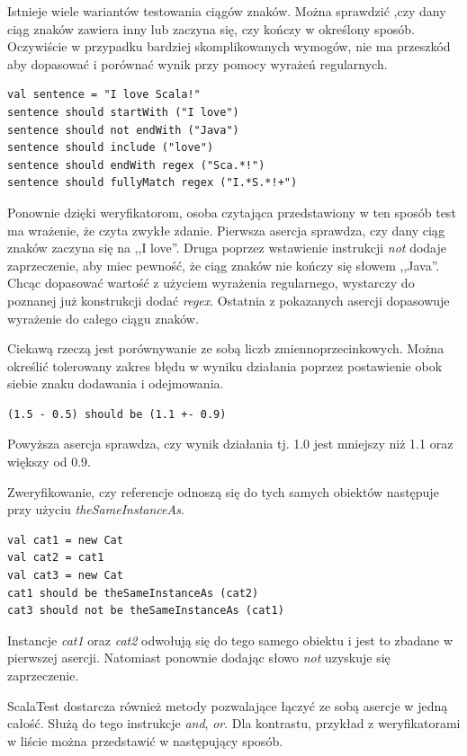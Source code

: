 \documentclass[brudnopis]{xmgr}
\begin{document}
Istnieje wiele wariantów testowania ciągów znaków. Można sprawdzić ,czy dany ciąg znaków zawiera inny lub zaczyna się, czy kończy w określony sposób. Oczywiście w przypadku bardziej skomplikowanych wymogów, nie ma przeszkód aby dopasować i porównać wynik przy pomocy wyrażeń regularnych.

\begin{verbatim}
val sentence = "I love Scala!"
sentence should startWith ("I love")
sentence should not endWith ("Java")
sentence should include ("love")
sentence should endWith regex ("Sca.*!")
sentence should fullyMatch regex ("I.*S.*!+")
\end{verbatim}

Ponownie dzięki weryfikatorom, osoba czytająca przedstawiony w ten sposób test ma wrażenie, że czyta zwykłe zdanie. Pierwsza asercja sprawdza, czy dany ciąg znaków zaczyna się na ,,I love''. Druga poprzez wstawienie instrukcji \emph{not} dodaje zaprzeczenie, aby miec pewność, że ciąg znaków nie kończy się słowem ,,Java''. Chcąc dopasować wartość z użyciem wyrażenia regularnego, wystarczy do poznanej już konstrukcji dodać \emph{regex}. Ostatnia z pokazanych asercji dopasowuje wyrażenie do całego ciągu znaków.

Ciekawą rzeczą jest porównywanie ze sobą liczb zmiennoprzecinkowych. Można określić tolerowany zakres błędu w wyniku działania poprzez postawienie obok siebie znaku dodawania i odejmowania.

\begin{verbatim}
(1.5 - 0.5) should be (1.1 +- 0.9)
\end{verbatim}

Powyższa asercja sprawdza, czy wynik działania tj. 1.0 jest mniejszy niż 1.1 oraz większy od 0.9.

Zweryfikowanie, czy referencje odnoszą się do tych samych obiektów następuje przy użyciu \emph{theSameInstanceAs}.

\begin{verbatim}
val cat1 = new Cat
val cat2 = cat1
val cat3 = new Cat	
cat1 should be theSameInstanceAs (cat2)
cat3 should not be theSameInstanceAs (cat1)
\end{verbatim}

Instancje \emph{cat1} oraz \emph{cat2} odwołują się do tego samego obiektu i jest to zbadane w pierwszej asercji. Natomiast ponownie dodając słowo \emph{not} uzyskuje się zaprzeczenie.

ScalaTest dostarcza również metody pozwalające łączyć ze sobą asercje w jedną całość. Służą do tego instrukcje \emph{and}, \emph{or}. Dla kontrastu, przykład z weryfikatorami w liście można przedstawić w następujący sposób.
\end{document}
